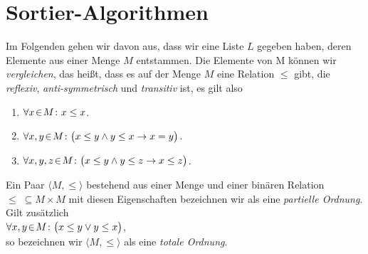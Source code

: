 \chapter{Sortier-Algorithmen}
Im Folgenden gehen wir davon aus, dass wir eine Liste $L$ gegeben haben, deren Elemente
aus einer Menge $M$ entstammen.  
Die Elemente von M k\"onnen wir \emph{vergleichen}, das
hei{\ss}t, dass es auf der Menge $M$  eine Relation
$\leq$ gibt, die \emph{reflexiv}, \emph{anti-symmetrisch} und \emph{transitiv} ist, es gilt also  
\begin{enumerate}
\item $\forall x \!\in\! M \colon x \leq x$.
\item $\forall x, y \!\in\! M \colon \bigl(x \leq y \wedge y \leq x \rightarrow x = y\bigr)$.
\item $\forall x, y, z \!\in\! M \colon \bigl(x \leq y \wedge y \leq z \rightarrow x \leq z\bigr)$. 
\end{enumerate}
Ein Paar $\langle M, \leq \rangle$ bestehend aus einer Menge und einer bin\"aren Relation
$\leq \;\subseteq M \times M$ mit diesen Eigenschaften bezeichnen wir als eine
\emph{partielle Ordnung}.  Gilt zus\"atzlich \\[0.2cm]
\hspace*{1.3cm} $\forall x, y \!\in\! M \colon\bigl( x \leq y \vee y \leq x\bigr)$, \\[0.2cm]
so bezeichnen wir $\langle M, \leq \rangle$ als eine \emph{totale Ordnung}.
\vspace*{0.3cm}

